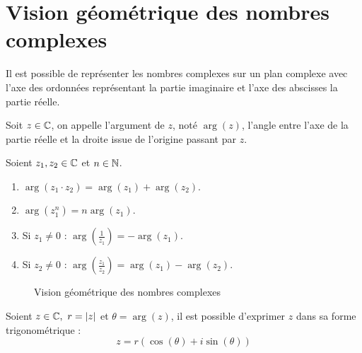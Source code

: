 \section{Vision géométrique des nombres complexes}
Il est possible de représenter les nombres complexes sur un plan complexe avec l'axe des ordonnées représentant la partie imaginaire et l'axe des abscisses la partie réelle.

\begin{definition}
	Soit $z \in \mathbb{C}$, on appelle l'argument de $z$, noté $\arg(z)$, l'angle entre l'axe de la partie réelle et la droite issue de l'origine passant par $z$. 
\end{definition}

\begin{proposition}
	Soient $z_1, z_2 \in \mathbb{C}$ et $n \in \mathbb{N}$.
	\begin{enumerate}
		\item $\arg(z_1 \cdot z_2) = \arg(z_1) + \arg(z_2)$.
		\item $\arg(z_1^n) = n \arg(z_1)$.
		\item Si $z_1 \neq 0$ : $\arg \left(\frac{1}{z_1} \right) = - \arg(z_1)$.
		\item Si $z_2 \neq 0$ : $\arg \left( \frac{z_1}{z_2} \right) = \arg(z_1) - \arg(z_2)$.
	\end{enumerate}
\end{proposition}

\begin{figure}[!ht]
	\centering
	\caption{Vision géométrique des nombres complexes}
\end{figure}

\needspace{5cm}

\begin{definition}
	Soient $z \in \mathbb{C},\ r = \abs{z}$ et $\theta = \arg(z)$, il est possible d'exprimer $z$ dans sa forme trigonométrique :
	\[ z = r \left( \cos(\theta) + i \sin(\theta) \right) \]
\end{definition}

